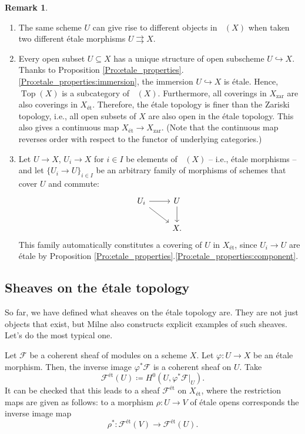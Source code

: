 \documentclass{report}
\DeclareMathOperator{\Top}{Top}
\DeclareMathOperator{\Et}{\acute{E}t}
\theoremstyle{definition}
\newtheorem{remark}[theorem]{Remark}
\begin{document}
\begin{remark}
\begin{enumerate}
\item The same scheme $U$ can give rise to different objects in $\Et(X)$ when taken two different \'{e}tale morphisms $U\rightrightarrows X$.

\item Every open subset $U\subseteq X$ has a unique structure of open subscheme $U\hookrightarrow X$. Thanks to Proposition \ref{Pro:etale_properties}.\ref{Pro:etale_properties:immersion}, the immersion $U\hookrightarrow X$ is \'{e}tale. Hence, $\Top(X)$ is a subcategory of $\Et(X)$. Furthermore, all coverings in $X_{\text{zar}}$ are also coverings in $X_{\text{\'{e}t}}$. Therefore, the \'{e}tale topology is finer than the Zariski topology, i.e., all open subsets of $X$ are also open in the \'{e}tale topology. This also gives a continuous map $X_{\text{\'{e}t}}\rightarrow X_{\text{zar}}$. (Note that the continuous map reverses order with respect to the functor of underlying categories.)

\item Let $U\rightarrow X$, $U_i\rightarrow X$ for $i\in I$ be elements of $\Et(X)$ -- i.e., \'{e}tale morphisms -- and let $\{U_i\rightarrow U\}_{i\in I}$ be an arbitrary family of morphisms of schemes that cover $U$ and commute:
\[
\begin{tikzcd}
U_i\arrow[r]\arrow[rd]&U\arrow[d]\\
&X.
\end{tikzcd}
\]
This family automatically constitutes a covering of $U$ in $X_{\text{\'{e}t}}$, since $U_i\rightarrow U$ are \'{e}tale by Proposition \ref{Pro:etale_properties}.\ref{Pro:etale_properties:component}.
\end{enumerate}
\end{remark}

\subsection{Sheaves on the \'{e}tale topology}

So far, we have defined what sheaves on the \'{e}tale topology are. They are not just objects that exist, but Milne \cite[Section~I.6]{milne2013lectures} also constructs explicit examples of such sheaves. Let's do the most typical one.

Let $\mathcal{F}$ be a coherent sheaf of modules on a scheme $X$. Let $\varphi:U\rightarrow X$ be an \'{e}tale morphism. Then, the inverse image $\varphi^*\mathcal{F}$ is a coherent sheaf on $U$. Take
\[\mathcal{F}^{\text{\'{e}t}}(U)\coloneqq H^0(U,\varphi^*\mathcal{F}|_U).\]
It can be checked that this leads to a sheaf $\mathcal{F}^{\text{\'{e}t}}$ on $X_{\text{\'{e}t}}$, where the restriction maps are given as follows: to a morphism $\rho:U\rightarrow V$ of \'{e}tale opens corresponds the inverse image map
\[\rho^*:\mathcal{F}^{\text{\'{e}t}}(V)\longrightarrow\mathcal{F}^{\text{\'{e}t}}(U).\]
\end{document}
